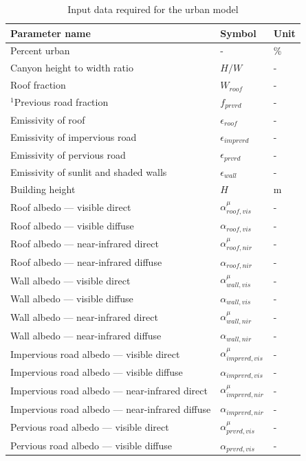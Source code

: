 \documentclass[12pt,authoryear]{elsarticle}
\numberwithin{equation}{section} %
\begin{document}
\begin{longtable}{p{10cm} p{3cm} p{3cm}}
\caption{Input data required for the urban model}
\label{tab:input_data}\\
\toprule
Parameter name & Symbol & Unit \\
\midrule
Percent urban & - & \% \\
Canyon height to width ratio & $H/W$ & -\\
Roof fraction & $W_{roof}$ & - \\
$^{1}$Previous road fraction & $f_{prvrd}$ & - \\
Emissivity of roof & $\epsilon_{roof}$ & - \\
Emissivity of impervious road & $\epsilon_{imprvrd}$ & - \\
Emissivity of pervious road & $\epsilon_{prvrd}$ & - \\
Emissivity of sunlit and shaded walls & $\epsilon_{wall}$ & - \\
Building height & $H$ & m \\
Roof albedo --- visible direct & $\alpha_{roof,vis}^{\mu}$ & - \\
Roof albedo --- visible diffuse & $\alpha_{roof,vis}$ & - \\
Roof albedo --- near-infrared direct & $\alpha_{roof,nir}^{\mu}$ & - \\
Roof albedo --- near-infrared diffuse & $\alpha_{roof,nir}$ & - \\
Wall albedo --- visible direct & $\alpha_{wall,vis}^{\mu}$ & - \\
Wall albedo --- visible diffuse & $\alpha_{wall,vis}$ & - \\
Wall albedo --- near-infrared direct & $\alpha_{wall,nir}^{\mu}$ & - \\
Wall albedo --- near-infrared diffuse & $\alpha_{wall,nir}$ & - \\
Impervious road albedo --- visible direct & $\alpha_{imprvrd,vis}^{\mu}$ & - \\
Impervious road albedo --- visible diffuse & $\alpha_{imprvrd,vis}$ & - \\
Impervious road albedo --- near-infrared direct & $\alpha_{imprvrd,nir}^{\mu}$ & - \\
Impervious road albedo --- near-infrared diffuse & $\alpha_{imprvrd,nir}$ & - \\
Pervious road albedo --- visible direct & $\alpha_{prvrd,vis}^{\mu}$ & - \\
Pervious road albedo --- visible diffuse & $\alpha_{prvrd,vis}$ & - \\

\end{longtable}
\end{document}
